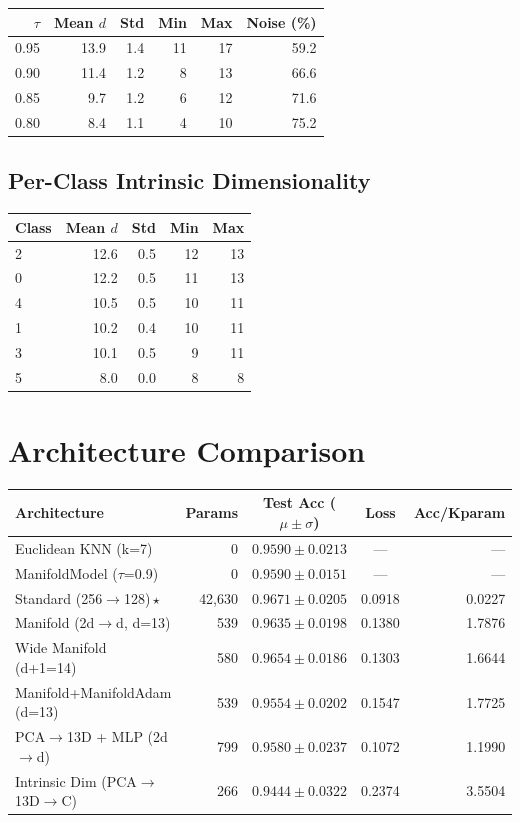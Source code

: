 \documentclass[11pt,letterpaper]{article}
\begin{document}
\begin{tabular}{@{}rrrrrr@{}}
\toprule
$\tau$ & Mean $d$ & Std & Min & Max & Noise (\%) \\
\midrule
  0.95 & 13.9 & 1.4 & 11 & 17 & 59.2 \\
  0.90 & 11.4 & 1.2 & 8 & 13 & 66.6 \\
  0.85 & 9.7 & 1.2 & 6 & 12 & 71.6 \\
  0.80 & 8.4 & 1.1 & 4 & 10 & 75.2 \\
\bottomrule
\end{tabular}

\subsection{Per-Class Intrinsic Dimensionality}

\begin{tabular}{@{}lrrrr@{}}
\toprule
Class & Mean $d$ & Std & Min & Max \\
\midrule
  2 & 12.6 & 0.5 & 12 & 13 \\
  0 & 12.2 & 0.5 & 11 & 13 \\
  4 & 10.5 & 0.5 & 10 & 11 \\
  1 & 10.2 & 0.4 & 10 & 11 \\
  3 & 10.1 & 0.5 & 9 & 11 \\
  5 & 8.0 & 0.0 & 8 & 8 \\
\bottomrule
\end{tabular}

\section{Architecture Comparison}

{\small
\begin{tabular}{@{}p{7cm}rccr@{}}
\toprule
\textbf{Architecture} & \textbf{Params} & \textbf{Test Acc ($\mu \pm \sigma$)} & \textbf{Loss} & \textbf{Acc/Kparam} \\
\midrule
  {Euclidean KNN (k=7)} & 0 & $0.9590 \pm 0.0213$ & --- & --- \\
  {ManifoldModel ($\tau$=0.9)} & 0 & $0.9590 \pm 0.0151$ & --- & --- \\
  {\color{wincolor}Standard (256$\rightarrow$128)\,$\star$} & 42,630 & $0.9671 \pm 0.0205$ & 0.0918 & 0.0227 \\
  {Manifold (2d$\rightarrow$d, d=13)} & 539 & $0.9635 \pm 0.0198$ & 0.1380 & 1.7876 \\
  {Wide Manifold (d+1=14)} & 580 & $0.9654 \pm 0.0186$ & 0.1303 & 1.6644 \\
  {Manifold+ManifoldAdam (d=13)} & 539 & $0.9554 \pm 0.0202$ & 0.1547 & 1.7725 \\
  {PCA$\rightarrow$13D + MLP (2d$\rightarrow$d)} & 799 & $0.9580 \pm 0.0237$ & 0.1072 & 1.1990 \\
  {Intrinsic Dim (PCA$\rightarrow$13D$\rightarrow$C)} & 266 & $0.9444 \pm 0.0322$ & 0.2374 & 3.5504 \\
\bottomrule
\end{tabular}
}
\end{document}
